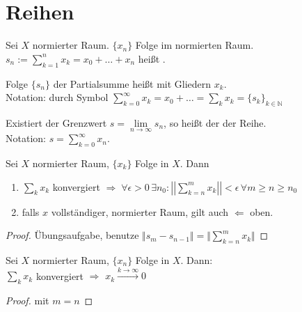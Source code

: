 \section{Reihen}
\begin{*definition}[Partialsumme]
	Sei $X$ normierter Raum. $\{x_n\}$ Folge im normierten Raum.\\
	$s_n :=\sum_{k=1}^n x_k = x_0 + \dotsc + x_n$ heißt .
	
	Folge $\{s_n\}$ der Partialsumme heißt  mit Gliedern $x_k$.\\
	Notation: durch Symbol $\sum_{k=0}^\infty x_k = x_0 + \dotsc = \sum_k x_k = \{s_k\}_{k\in\mathbb{N}}$
	
	Existiert der Grenzwert $s = \lim\limits_{n\rightarrow\infty} s_n$, so heißt der  der Reihe.\\
	Notation: $s = \sum_{k=0}^\infty x_n$.
\end{*definition}

\begin{proposition}
	Sei $X$ normierter Raum, $\{x_k\}$ Folge in $X$. Dann
	\begin{enumerate}[label={\arabic*)}]
		\item $\sum_k x_k$ konvergiert $\Rightarrow\;\forall \epsilon > 0\,\exists n_0: \left|\left|\sum_{k=n}^m x_k\right|\right| < \epsilon\,\forall m\ge n\ge n_0$
		\item falls $x$ vollständiger, normierter Raum, gilt auch $\Leftarrow$ oben.
	\end{enumerate}
\end{proposition}
\begin{proof}
	Übungsaufgabe, benutze $\Vert s_m-s_{n-1}\Vert=\Vert\sum_{k=n}^m x_k\Vert$
\end{proof}

\begin{conclusion}
	Sei $X$ normierter Raum, $\{x_n\}$ Folge in $X$. Dann:\\
	$\sum_k x_k$ konvergiert $\Rightarrow$ $x_k\overset{k\rightarrow \infty}{\longrightarrow}0$
\end{conclusion}
\begin{proof}
	 mit $m=n$
\end{proof}

